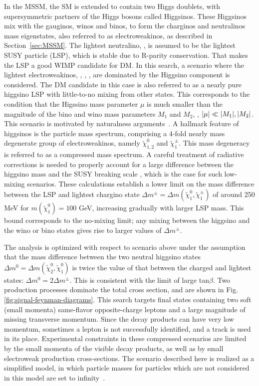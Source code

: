 In the MSSM, the SM is extended to contain two Higgs doublets, with supersymmetric partners of the Higgs bosons called Higgsinos. These Higgsinos mix with the gauginos, winos and binos, to form the charginos and neutralinos mass eigenstates, also referred to as electroweakinos, as described in Section~\ref{sec:MSSM}. The lightest neutralino, \PSGczDo, is assumed to be the lightest SUSY particle (LSP), which is stable due to R-parity conservation. That makes the LSP a good WIMP candidate for DM. In this search, a scenario where the lightest electroweakinos, \PSGczDt, \PSGcpmDo, \PSGczDo, are dominated by the Higgsino component is considered. The DM candidate in this case is also referred to as a nearly pure higgsino LSP with little-to-no mixing from other states. This corresponds to the condition that the Higssino mass parameter $\mu$ is much smaller than the magnitude of the bino and wino mass parameters $M_1$ and $M_2$, \ie, $\abs{\mu}\ll \abs{M_1},\abs{M_2}$. This scenario is motivated by naturalness arguments~\cite{BARBIERI198863,de_Carlos_1993}. A hallmark feature of higgsinos is the particle mass spectrum, comprising a 4-fold nearly mass degenerate group of electroweakinos, namely $\tilde{\chi}_{1,2}^{0}$ and $\tilde{\chi}_{1}^{\pm}$. This mass degeneracy is referred to as a compressed mass spectrum. A careful treatment of radiative corrections is needed to properly account for a large difference between the higgsino mass and the SUSY breaking scale \cite{Nagata_2015}, which is the case for such low-mixing scenarios. These calculations establish a lower limit on the mass difference between the LSP and lightest chargino state $\Delta m^{\pm}=\Delta m(\tilde{\chi}_{1}^{0},\tilde{\chi}_{1}^{\pm})$ of around 250 MeV for $m(\tilde{\chi}_{1}^{0})=100$ GeV, increasing gradually with larger LSP mass. This bound corresponds to the no-mixing limit; any mixing between the higgsino and the wino or bino states gives rise to larger values of $\Delta m^{\pm}$. 

The analysis is optimized with respect to scenario above under the assumption that the mass difference between the two neutral higgsino states $\Delta m^{0} = \Delta m(\tilde{\chi}_{2}^{0}, \tilde{\chi}_{1}^{0})$ is twice the value of that between the charged and lightest states: $\Delta m^{0} = 2\Delta m^{\pm}$. This is consistent with the limit of large tan$\beta$. Two production processes dominate the total cross section, and are shown in Fig. \ref{fig:signal-feynman-diagrams}. This search targets final states containing two soft (small momenta) same-flavor opposite-charge leptons and a large magnitude of missing transverse momentum. Since the decay products can have very low momentum, sometimes a lepton is not successfully identified, and a track is used in its place. Experimental constraints in these compressed scenarios are limited by the small momenta of the visible decay products, as well as by small electroweak production cross-sections. The scenario described here is realized as a simplified model, in which particle masses for particles which are not considered in this model are set to infinity~\cite{Chatrchyan_2013}.

